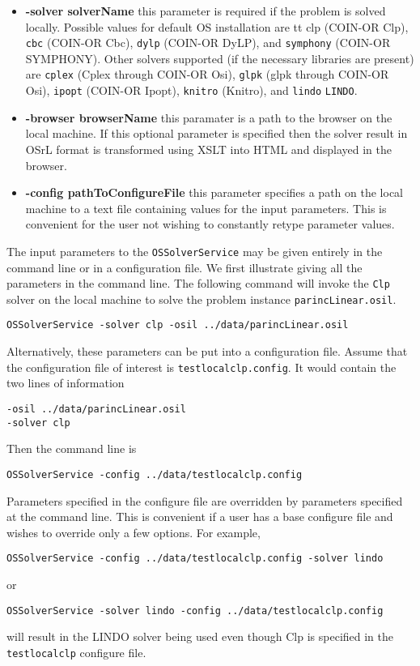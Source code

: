 \documentclass[12pt]{article}
\renewcommand{\_}{{\char"5F}}
\renewcommand{\{}{{\char"7B}}
\renewcommand{\}}{{\char"7D}}
\renewcommand{\^}{{\char"0D}}
\renewcommand{\'}{{\char"0D}}
\begin{document}
\begin{itemize}
\item[] {\bf -solver  solverName} this parameter is required if the problem is solved locally. Possible values for default OS installation are {tt clp} (COIN-OR Clp), {\tt cbc} (COIN-OR Cbc), {\tt dylp} (COIN-OR DyLP), and {\tt symphony} (COIN-OR SYMPHONY). Other solvers supported (if the necessary libraries are present) are {\tt cplex} (Cplex through COIN-OR Osi), {\tt glpk} (glpk through COIN-OR Osi), {\tt ipopt} (COIN-OR Ipopt),  {\tt knitro} (Knitro), and {\tt lindo} {\tt LINDO}.


\item[] {\bf -browser  browserName} this paramater is a path to the browser on the local machine. If this optional parameter is specified then the solver result in OSrL format is transformed using XSLT into HTML and displayed in the browser. 

\item[] {\bf -config pathToConfigureFile} this parameter specifies a path on the local machine to a text file containing values for the input parameters. This is convenient for the user not wishing to constantly retype parameter values.

\end{itemize}






The input parameters to the {\tt OSSolverService} may be given entirely in the command line or in a configuration file.  We first illustrate giving all the  parameters in the command line. The following command will invoke the {\tt Clp} solver on the local machine to solve the problem instance {\tt parincLinear.osil}.

\begin{verbatim}
OSSolverService -solver clp -osil ../data/parincLinear.osil 
\end{verbatim}

Alternatively, these parameters can be put into a configuration file. Assume that the configuration file of interest is {\tt testlocalclp.config}. It would contain the two lines of information
\begin{verbatim}
-osil ../data/parincLinear.osil
-solver clp
\end{verbatim}
Then the command line is
\begin{verbatim}
OSSolverService -config ../data/testlocalclp.config
\end{verbatim}


Parameters specified in the configure file are overridden by parameters specified at the command line. This is convenient if a user has a base configure file and wishes to override only a few options. For example,
\begin{verbatim}
OSSolverService -config ../data/testlocalclp.config -solver lindo
\end{verbatim}
or
\begin{verbatim}
OSSolverService -solver lindo -config ../data/testlocalclp.config 
\end{verbatim}
will result in the LINDO solver being used even though Clp is specified in the {\tt testlocalclp} configure file.
\end{document}
